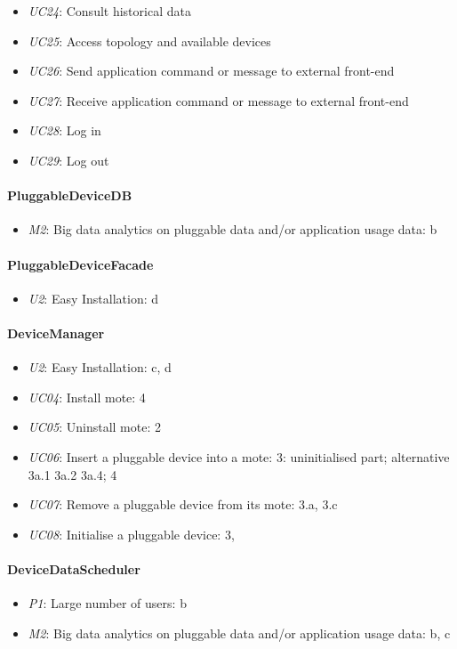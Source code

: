 \begin{itemize}
            \item \emph{UC24}: Consult historical data
            \item \emph{UC25}: Access topology and available devices
            \item \emph{UC26}: Send application command or message to external front-end
            \item \emph{UC27}: Receive application command or message to external front-end
            \item \emph{UC28}: Log in
            \item \emph{UC29}: Log out
        \end{itemize}

    \paragraph{PluggableDeviceDB}
        \begin{itemize}
            \item \emph{M2}: Big data analytics on pluggable data and/or application usage data: b
        \end{itemize}

    \paragraph{PluggableDeviceFacade}
        \begin{itemize}
        	\item \emph{U2}: Easy Installation: d
        \end{itemize}

    \paragraph{DeviceManager}
        \begin{itemize}
            \item \emph{U2}: Easy Installation: c, d
            \item \emph{UC04}: Install mote: 4
            \item \emph{UC05}: Uninstall mote: 2
            \item \emph{UC06}: Insert a pluggable device into a mote: 3: uninitialised part; alternative 3a.1 3a.2 3a.4; 4
            \item \emph{UC07}: Remove a pluggable device from its mote: 3.a, 3.c
            \item \emph{UC08}: Initialise a pluggable device: 3,
        \end{itemize}

    \paragraph{DeviceDataScheduler}
        \begin{itemize}
            \item \emph{P1}: Large number of users: b
            \item \emph{M2}: Big data analytics on pluggable data and/or application usage data: b, c
        \end{itemize}
